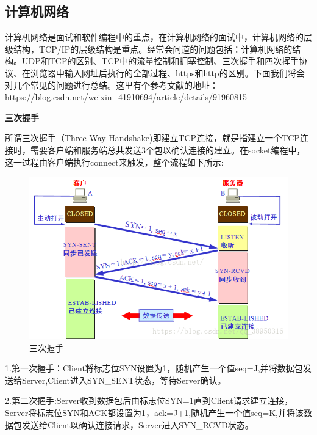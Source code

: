 \documentclass[UTF8]{ctexart}
\begin{document}
\subsection{计算机网络}
计算机网络是面试和软件编程中的重点，在计算机网络的面试中，计算机网络的层级结构，TCP/IP的层级结构是重点。经常会问道的问题包括：计算机网络的结构。UDP和TCP的区别、TCP中的流量控制和拥塞控制、三次握手和四次挥手协议、在浏览器中输入网址后执行的全部过程、https和http的区别。下面我们将会对几个常见的问题进行总结。这里有个参考文献的地址：\\
https://blog.csdn.net/weixin\_41910694/article/details/91960815

\textbf{三次握手}

所谓三次握手（Three-Way Handshake)即建立TCP连接，就是指建立一个TCP连接时，需要客户端和服务端总共发送3个包以确认连接的建立。在socket编程中，这一过程由客户端执行connect来触发，整个流程如下所示:
\begin{figure}[htbp]
\centering
\includegraphics[height=1\linewidth,width=1\textwidth]{Figure/Three.png}
\caption{三次握手}
\end{figure}

1.第一次握手：Client将标志位SYN设置为1，随机产生一个值seq=J,并将数据包发送给Server,Client进入SYN\_SENT状态，等待Server确认。

2.第二次握手:Server收到数据包后由标志位SYN=1直到Client请求建立连接，Server将标志位SYN和ACK都设置为1，ack=J+1,随机产生一个值seq=K,并将该数据包发送给Client以确认连接请求，Server进入SYN\_RCVD状态。
\end{document}
